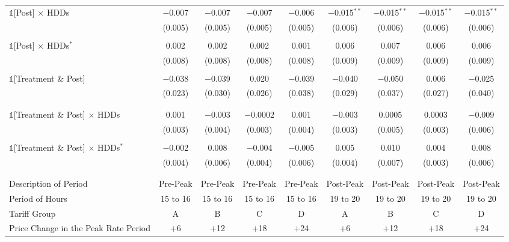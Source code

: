 \begin{table}[ht!]
{\begin{ThreePartTable}
\begin{landscape}
\begin{longtable}{@{\extracolsep{1.5pt}}lcccccccc}
                $\mathbb{1}$[Post] $\times$ HDDs & $-$0.007 & $-$0.007 & $-$0.007 & $-$0.006 & $-$0.015$^{**}$ & $-$0.015$^{**}$ & $-$0.015$^{**}$ & $-$0.015$^{**}$ \\
                & (0.005) & (0.005) & (0.005) & (0.005) & (0.006) & (0.006) & (0.006) & (0.006) \\
                & & & & & & & & \\
                $\mathbb{1}$[Post] $\times$ HDDs$^{*}$ & 0.002 & 0.002 & 0.002 & 0.001 & 0.006 & 0.007 & 0.006 & 0.006 \\
                & (0.008) & (0.008) & (0.008) & (0.008) & (0.009) & (0.009) & (0.009) & (0.009) \\
                & & & & & & & & \\
                $\mathbb{1}$[Treatment \& Post] & $-$0.038 & $-$0.039 & 0.020 & $-$0.039 & $-$0.040 & $-$0.050 & 0.006 & $-$0.025 \\
                & (0.023) & (0.030) & (0.026) & (0.038) & (0.029) & (0.037) & (0.027) & (0.040) \\
                & & & & & & & & \\
                & & & & & & & & \\
                $\mathbb{1}$[Treatment \& Post] $\times$ HDDs & 0.001 & $-$0.003 & $-$0.0002 & 0.001 & $-$0.003 & 0.0005 & 0.0003 & $-$0.009 \\
                & (0.003) & (0.004) & (0.003) & (0.004) & (0.003) & (0.005) & (0.003) & (0.006) \\
                & & & & & & & & \\
                $\mathbb{1}$[Treatment \& Post] $\times$ HDDs$^{*}$ & $-$0.002 & 0.008 & $-$0.004 & $-$0.005 & 0.005 & 0.010 & 0.004 & 0.008 \\
                & (0.004) & (0.006) & (0.004) & (0.006) & (0.004) & (0.007) & (0.003) & (0.006) \\
                & & & \\
                \hline
                \\[-2.0ex]
                Description of Period & Pre-Peak & Pre-Peak & Pre-Peak & Pre-Peak & Post-Peak & Post-Peak & Post-Peak & Post-Peak \\
                Period of Hours & 15 to 16 & 15 to 16 & 15 to 16 & 15 to 16 & 19 to 20 & 19 to 20 & 19 to 20 & 19 to 20 \\
                Tariff Group & A & B & C & D & A & B & C & D \\
                Price Change in the Peak Rate Period & +6 & +12 & +18 & +24 & +6 & +12 & +18 & +24 \\

\end{longtable}
\end{landscape}
\end{ThreePartTable}}
\end{table}
